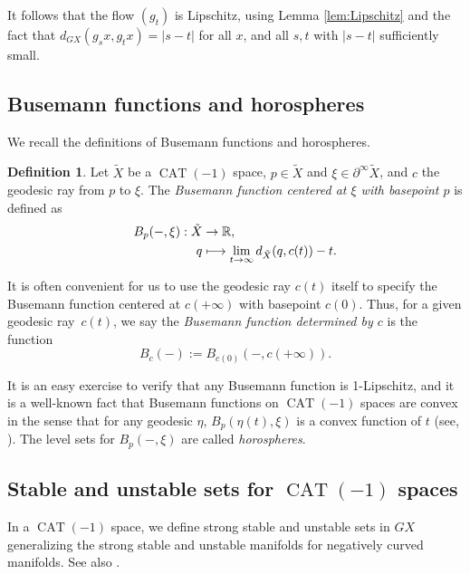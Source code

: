 \documentclass[10pt]{amsart}
\def\mto{\mathchoice{\longmapsto}{\mapsto}{\mapsto}{\mapsto}}
\theoremstyle{definition}
\newtheorem{defn}[thm]{Definition}
\numberwithin{equation}{section}
\DeclareMathOperator{\CAT}{CAT}
\begin{document}
It follows that the flow $(g_t)$ is Lipschitz, using Lemma \ref{lem:Lipschitz} and the fact that $d_{GX}(g_sx, g_tx) = |s-t|$ for all $x$, and all $s, t$ with $|s-t|$ sufficiently small.

\subsection{Busemann functions and horospheres}

We recall the definitions of Busemann functions and horospheres.

\begin{defn}
Let $\tilde X$ be a $\CAT(-1)$ space, $p\in \tilde X$ and $\xi\in \partial^\infty\tilde X$, and $c$ the geodesic ray from $p$ to $\xi$. The \emph{Busemann function centered at $\xi$ with basepoint $p$} is defined as
\begin{align*}
B_p(-,\xi): \tilde X &\to \mathbb{R},\\
q &\mto \lim_{t\to\infty} d_{\tilde X}(q,c(t))-t.
\end{align*}
\end{defn}

It is often convenient for us to use the geodesic ray $c(t)$ itself to specify the Busemann function centered at $c(+\infty)$ with basepoint $c(0)$. Thus, for a given geodesic ray~$c(t)$, we say the \emph{Busemann function determined by $c$} is the function
\[
B_c(-):= B_{c(0)} (-, c(+\infty)).
\]

It is an easy exercise to verify that any Busemann function is 1-Lipschitz, and it is a well-known fact that Busemann functions on $\CAT(-1)$ spaces are convex in the sense that for any geodesic $\eta$, $B_p(\eta(t),\xi)$ is a convex function of $t$ (see, \eg \cite[Prop.\,II.8.22]{bh}). The level sets for $B_p(-,\xi)$ are called \emph{horospheres}.

\subsection{Stable and unstable sets for $\CAT(-1)$ spaces}

In a $\CAT(-1)$ space, we define strong stable and unstable sets in $G X$ generalizing the strong stable and unstable manifolds for negatively curved manifolds. See also \cite[\S2.8]{mB95}.
\end{document}
